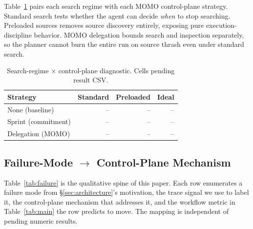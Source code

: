 Table~\ref{tab:stopping} pairs each search regime with each MOMO control-plane strategy. Standard search tests whether the agent can decide \emph{when} to stop searching. Preloaded sources removes source discovery entirely, exposing pure execution-discipline behavior. MOMO delegation bounds search and inspection separately, so the planner cannot burn the entire run on source thrash even under standard search.

\begin{table}[t]
\caption{Search-regime $\times$ control-plane diagnostic. Cells pending result CSV.}
\label{tab:stopping}
\centering
\begin{tabular}{lrrr}
\toprule
Strategy & Standard & Preloaded & Ideal \\
\midrule
None (baseline)           & -- & -- & -- \\
Sprint (commitment)       & -- & -- & -- \\
Delegation (MOMO)         & -- & -- & -- \\
\bottomrule
\end{tabular}
\end{table}

\subsection{Failure-Mode $\rightarrow$ Control-Plane Mechanism}

Table~\ref{tab:failure} is the qualitative spine of this paper. Each row enumerates a failure mode from \S\ref{sec:architecture}'s motivation, the trace signal we use to label it, the control-plane mechanism that addresses it, and the workflow metric in Table~\ref{tab:main} the row predicts to move. The mapping is independent of pending numeric results.


